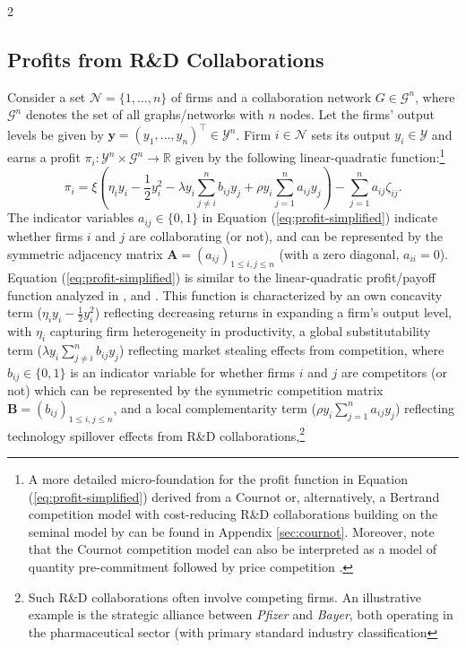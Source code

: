 \documentclass[12pt]{article}
\begin{document}
\begin{spacing}{2}
\subsection{Profits from R\&D Collaborations}
\label{sec:model-profits}
Consider a set $\mathcal{N}=\{1,\dots,n\}$ of firms and a collaboration network $G \in \mathcal{G}^n$, where $\mathcal{G}^n$ denotes the set of all graphs/networks with $n$ nodes. Let the firms' output levels be given by $\mathbf{y} = (y_1,\ldots,y_n)^{\top} \in \mathcal{Y}^n$. Firm $i \in \mathcal{N}$ sets its output $y_i \in \mathcal{Y}$ and earns a profit $\pi_i \colon \mathcal{Y}^n \times \mathcal{G}^n \to \mathbb{R}$ given by the following linear-quadratic function:\footnote{A more detailed micro-foundation for the profit function in Equation (\ref{eq:profit-simplified}) derived from a Cournot or, alternatively, a Bertrand competition model with cost-reducing R\&D collaborations building on the seminal model by \citet{goyal01:_r_d_networ} can be found in Appendix \ref{sec:cournot}. Moreover, note that the Cournot competition model can also be interpreted as a model of quantity pre-commitment followed by price competition \citep[cf.][]{kreps1983quantity}.}
\begin{equation}
\pi_i =
\xi \left( \eta_i y_i - \frac{1}{2} y_i^2
- \lambda y_i \sum_{j \ne i}^n b_{ij} y_j
+ \rho y_i \sum_{j=1}^n a_{ij} y_j \right)
- \sum_{j=1}^n a_{ij}\zeta_{ij}.
\label{eq:profit-simplified}
\end{equation}
The indicator variables $a_{ij} \in \{0,1\}$ in Equation (\ref{eq:profit-simplified}) indicate whether firms $i$ and $j$ are collaborating (or not), and can be represented by the symmetric adjacency matrix $\mathbf{A}=(a_{ij})_{1\le i,j \le n}$ (with a zero diagonal, $a_{ii}=0$). Equation (\ref{eq:profit-simplified}) is similar to the linear-quadratic profit/payoff function analyzed in \citet{Konig2018}, \citet{Hsieh2021} and \citet{ballester06:_who_networ}. This function is characterized by an own concavity term ($\eta_i y_i - \frac{1}{2} y_i^2$) reflecting decreasing returns in expanding a firm's output level, with $\eta_i$ capturing firm heterogeneity in productivity, a global substitutability term ($\lambda y_i \sum_{j \ne i}^n b_{ij} y_j$) reflecting market stealing effects from competition, where $b_{ij} \in \{0,1\}$ is an indicator variable for whether firms $i$ and $j$ are competitors (or not) which can be represented by the symmetric competition matrix $\mathbf{B}=(b_{ij})_{1\le i,j \le n}$, and a local complementarity term ($\rho y_i \sum_{j=1}^n a_{ij} y_j$) reflecting technology spillover effects from R\&D collaborations,\footnote{Such R\&D collaborations often involve competing firms. An illustrative example is the strategic alliance between \emph{Pfizer} and \emph{Bayer}, both operating in the pharmaceutical sector (with primary standard industry classification
}
\end{spacing}
\end{document}
